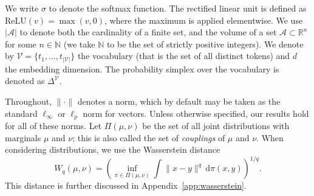 We write $\sigma$ to denote the softmax function. The rectified linear unit is defined as $\mathrm{ReLU}(v) = \max(v, 0)$, where the maximum is applied elementwise. We use $|\mathcal A|$ to denote both the cardinality of a finite set, and the volume of a set $\mathcal A\subset\mathbb R^n$ for some $n\in\mathbb N$ (we take $\mathbb N$ to be the set of strictly positive integers). We denote by $\mathcal V=\{t_1,\ldots,t_{|\mathcal V|}\}$ the vocabulary (that is the set of all distinct tokens) and $d$ the embedding dimension. The probability simplex over the vocabulary is denoted as $\Delta^{\mathcal{V}}$.

Throughout, $\|\cdot\|$ denotes a norm, which by default may be taken as the standard $\ell_\infty$ or $\ell_p$ norm for vectors. Unless otherwise specified, our results hold for all of these norms. Let $\Pi(\mu, \nu) $ be the set of all joint distributions with marginals $\mu $ and $\nu$; this is also called the set of {\em couplings} of $\mu$ and $\nu$. When considering distributions, we use the Wasserstein distance $$W_q(\mu, \nu) = \left( \inf_{\pi \in \Pi(\mu, \nu)} \int \|x - y\|^q \, \mathrm{d}\pi(x, y) \right)^{1/q}.$$ This distance is further discussed in Appendix~\ref{app:wasserstein}.
